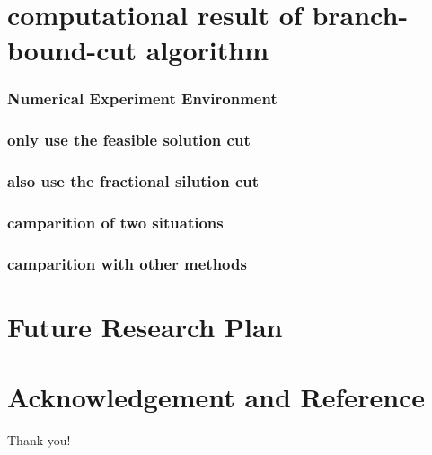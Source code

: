 \documentclass[10pt]{beamer}
\begin{document}
\section{computational result of branch-bound-cut algorithm}
\begin{frame}
    \frametitle{Numerical Experiment Environment}
\end{frame}

\begin{frame}
    \frametitle{only use the feasible solution cut}
\end{frame}

\begin{frame}
    \frametitle{also use the fractional silution cut}
\end{frame}

\begin{frame}
    \frametitle{camparition of two situations}
\end{frame}

\begin{frame}
    \frametitle{camparition with other methods}
\end{frame}





\section{Future Research Plan}

\section{Acknowledgement and Reference}
\begin{frame}
\textcolor{myNewColorA}{\Huge{\centerline{Thank you!}}}
\end{frame}

\begin{frame}
{\small


}
\end{frame}
\end{document}

